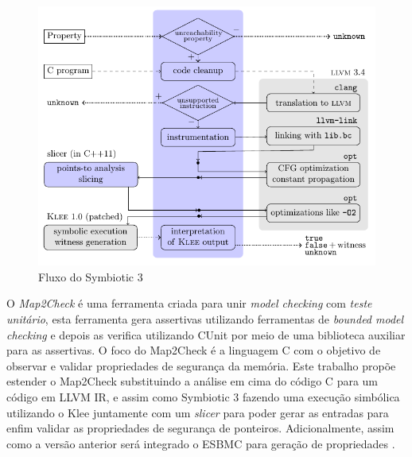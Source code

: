 \begin{figure}[H]
	\caption{\label{fig:fluxoSymbiotic} Fluxo do Symbiotic 3}
	\begin{center}
	    \includegraphics[scale=0.75]{resources/fluxoSymbiotic.png}
	\end{center}
\end{figure}

\par
O \textit{Map2Check} \cite{Rocha:2015} é uma ferramenta criada para unir \textit{model checking} com \textit{teste unitário}, esta ferramenta gera assertivas utilizando ferramentas de \textit{bounded model checking} e depois as verifica utilizando CUnit por meio de uma biblioteca auxiliar para as assertivas. O foco do Map2Check é a linguagem C com o objetivo de observar e validar propriedades de segurança da memória. Este trabalho propõe estender o Map2Check substituindo a análise em cima do código C para um código em LLVM IR, e assim como Symbiotic 3 \cite{Chalupa:2016} fazendo uma execução simbólica utilizando o Klee juntamente com um \textit{slicer} para poder gerar as entradas para enfim validar as propriedades de segurança de ponteiros. Adicionalmente, assim como a versão anterior será integrado o ESBMC para geração de propriedades \cite{Rocha:2015}.

